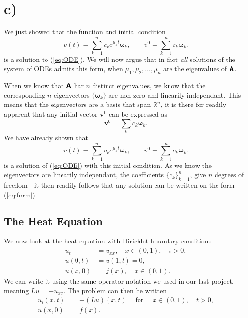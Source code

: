 \documentclass[a4paper, 11pt, notitlepage, english]{article}
\newcommand{\bt}[1]{\boldsymbol{#1}}
\newcommand{\mat}[1]{\textsf{\textbf{#1}}}
\begin{document}
\clearpage

\section*{c)}
We just showed that the function and initial condition
\begin{equation}
v(t)  = \sum_{k=1}^n c_k e^{\mu_k t} \bt{\omega}_k, \qquad v^0 = \sum_{k=1}^n c_k \bt{\omega}_k. \label{eq:form}
\end{equation}
is a solution to (\ref{eq:ODE}). We will now argue that in fact \emph{all} solutions of the system of ODEs admits this form, when $\mu_1, \mu_2, \ldots, \mu_n$ are the eigenvalues of $\mat{A}$.

When we know that $\mat{A}$ har $n$ distinct eigenvalues, we know that 
the corresponding $n$ eigenvectors $\{\bt{\omega}_k\}$ are non-zero 
and linearily independant. This means that the eigenvectors are a 
basis that span $\mathbb{R}^n$, it is there for readily apparent that 
any initial vector $\bt{v}^0$ can be expressed as
$$\bt{v}^0 = \sum_k c_k \bt{\omega}_k.$$
We have already shown that
\begin{equation}
v(t)  = \sum_{k=1}^n c_k e^{\mu_k t} \bt{\omega}_k, \qquad v^0 = \sum_{k=1}^n c_k \bt{\omega}_k.
\end{equation}
is a solution of (\ref{eq:ODE}) with this initial condition. As we know the eigenvectors are linearily independant, the coefficients $\{c_k\}_{k=1}^n$, give $n$ degrees of freedom---it then readily follows that any solution can be written on the form (\ref{eq:form}).

\subsection*{The Heat Equation}

We now look at the heat equation with Dirichlet boundary conditions
\begin{align}
u_t &= u_{xx}, \quad x\in(0,1), \quad t>0, \\
u(0,t) &= u(1,t) = 0, \\
u(x,0) &= f(x), \quad x\in(0,1).
\end{align}
We can write it using the same operator notation we used in our last project, meaning $Lu = -u_{xx}$. The problem can then be written
\begin{align*}
u_t(x,t) &= -(Lu)(x,t) \quad \mbox{ for } \quad x\in(0,1), \quad t>0, \\ 
u(x,0) &= f(x).    
\end{align*}
\end{document}

